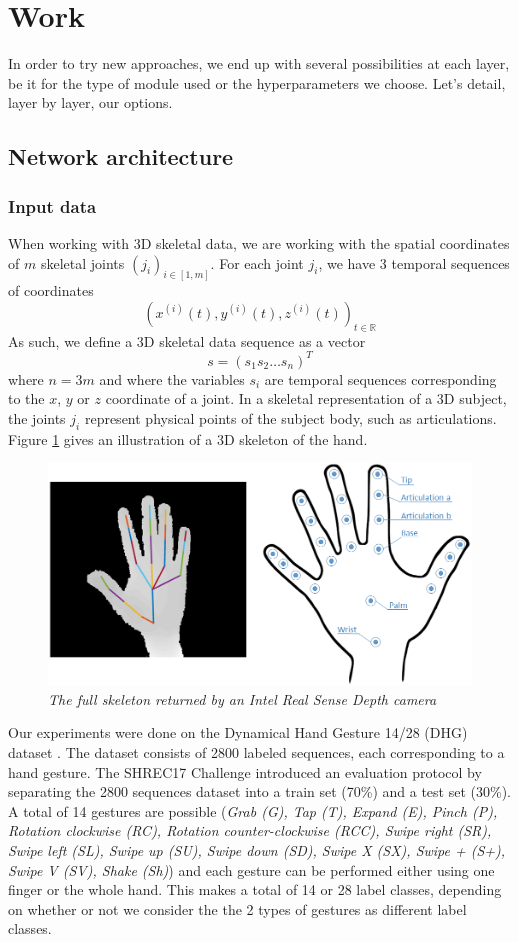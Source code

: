 \documentclass{article}
\begin{document}
\section{Work}
In order to try new approaches, we end up with several possibilities at each layer, be it for the type of module used or the hyperparameters we choose. Let's detail, layer by layer, our options.

\subsection{Network architecture}
\subsubsection{Input data}
When working with 3D skeletal data, we are working with the spatial coordinates of $m$ skeletal joints $(j_i)_{i\in[1,m]}$. For each joint $j_i$, we have 3 temporal sequences of coordinates
$$(x^{(i)}(t), y^{(i)}(t), z^{(i)}(t))_{t\in \mathbb R}$$
As such, we define a 3D skeletal data sequence as a vector
$$s = (s_1 s_2 \dots s_n)^T$$
where $n=3m$ and where the variables $s_i$ are temporal sequences corresponding to the $x$, $y$ or $z$ coordinate of a joint.
In a skeletal representation of a 3D subject, the joints $j_i$ represent physical points of the subject body, such as articulations. Figure \ref{fig:hand-skeleton} gives an illustration of a 3D skeleton of the hand.
\begin{figure}
    \centering
    \includegraphics[width=0.5 \linewidth]{img/skeleton.png}
    \caption{\textit{The full skeleton returned by an Intel Real Sense Depth camera}}
    \label{fig:hand-skeleton}
\end{figure}
\par
Our experiments were done on the Dynamical Hand Gesture 14/28 (DHG) dataset \cite{dhg-non-deep-approach}. The dataset consists of 2800 labeled sequences, each corresponding to a hand gesture. The SHREC17 Challenge \cite{desmedt:shrec} introduced an evaluation protocol by separating the 2800 sequences dataset into a train set (70\%) and a test set (30\%). A total of 14 gestures are possible (\textit{Grab (G), Tap (T), Expand (E), Pinch (P), Rotation clockwise (RC), Rotation counter-clockwise (RCC), Swipe right (SR), Swipe left (SL), Swipe up (SU), Swipe down (SD), Swipe X (SX), Swipe + (S+), Swipe V (SV), Shake (Sh)}) and each gesture can be performed either using one finger or the whole hand. This makes a total of 14 or 28 label classes, depending on whether or not we consider the the 2 types of gestures as different label classes.
\end{document}
